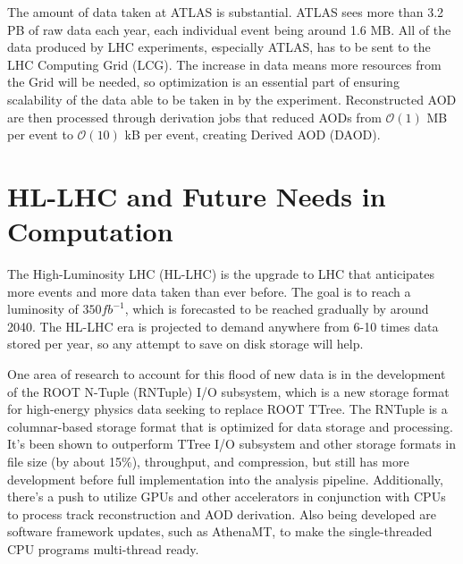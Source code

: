 The amount of data taken at ATLAS is substantial.
ATLAS sees more than 3.2 PB of raw data each year, each individual event being around 1.6 MB.\cite{ATLAS_Fact_Sheet} 
All of the data produced by LHC experiments, especially ATLAS, has to be sent to the LHC Computing Grid (LCG). 
The increase in data means more resources from the Grid will be needed, so optimization is an essential part of ensuring scalability of the data able to be taken in by the experiment.
Reconstructed AOD are then processed through derivation jobs that reduced AODs from  $\mathcal{O}(1)$ MB per event to $\mathcal{O}(10)$ kB per event, creating Derived AOD (DAOD). 

\section{HL-LHC and Future Needs in Computation}
The High-Luminosity LHC (HL-LHC) is the upgrade to LHC that anticipates more events and more data taken than ever before.
The goal is to reach a luminosity of $350 fb^{-1}$, which is forecasted to be reached gradually by around 2040.\cite{HL-LHC_Tech_design}
The HL-LHC era is projected to demand anywhere from 6-10 times data stored per year, so any attempt to save on disk storage will help.\cite{ATLAS_HL-LHC_projections}

One area of research to account for this flood of new data is in the development of the ROOT N-Tuple (RNTuple) I/O subsystem, which is a new storage format for high-energy physics data seeking to replace ROOT TTree. 
The RNTuple is a columnar-based storage format that is optimized for data storage and processing.
It's been shown to outperform TTree I/O subsystem and other storage formats in file size (by about 15\%), throughput, and compression, but still has more development before full implementation into the analysis pipeline.\cite{RNTuple_Lopez-Gomez_2023}\cite{RNTuple_Blomer}
Additionally, there's a push to utilize GPUs and other accelerators in conjunction with CPUs to process track reconstruction and AOD derivation.
Also being developed are software framework updates, such as AthenaMT, to make the single-threaded CPU programs multi-thread ready.\cite{AthenaMT_Leggett_2017}

